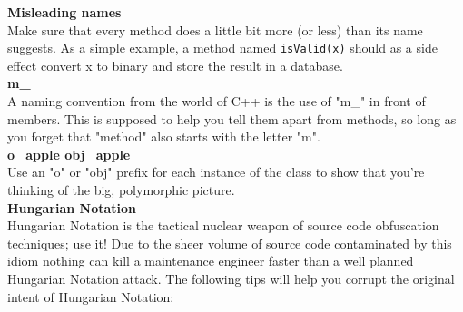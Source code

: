 \documentclass[11pt,twoside,a4paper]{article}
\begin{document}
\textbf{Misleading names}~\\
Make sure that every method does a little bit more (or less) than its name suggests. As a simple example, a method named \texttt{isValid(x)} should as a side effect convert x to binary and store the result in a database. ~\\

\textbf{m\_}~\\
A naming convention from the world of C++ is the use of "m\_" in front of members. This is supposed to help you tell them apart from methods, so long as you forget that "method" also starts with the letter "m".~\\ 

\textbf{o\_apple obj\_apple}~\\
Use an "o" or "obj" prefix for each instance of the class to show that you're thinking of the big, polymorphic picture.~\\ 

\textbf{Hungarian Notation}~\\
Hungarian Notation is the tactical nuclear weapon of source code obfuscation techniques; use it! Due to the sheer volume of source code contaminated by this idiom nothing can kill a maintenance engineer faster than a well planned Hungarian Notation attack. The following tips will help you corrupt the original intent of Hungarian Notation:~\\ 
\end{document}
